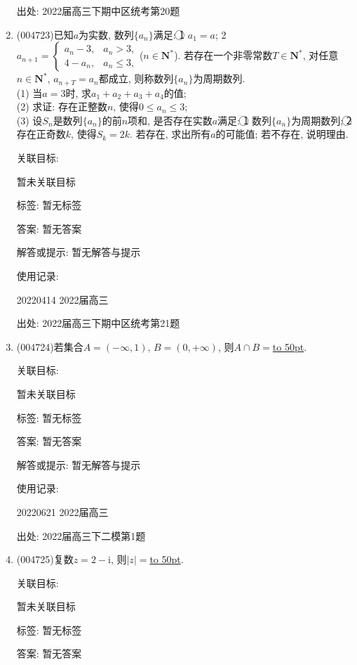 \documentclass[10pt,a4paper]{article}
\newcommand{\blank}[1]{\underline{\hbox to #1pt{}}}
\begin{document}
\begin{enumerate}[1.]
出处: 2022届高三下期中区统考第20题
\item { (004723)}已知$a$为实数, 数列$\{a_n\}$满足: \textcircled{1} $a_1=a$; \textcircled{2} $a_{n+1}=\begin{cases}
a_n-3, & a_n>3, \\ 4-a_n, & a_n\le 3,\end{cases}$($n\in \mathbf{N}^*$). 若存在一个非零常数$T\in \mathbf{N}^*$, 对任意$n\in \mathbf{N}^*$, $a_{n+T}=a_n$都成立, 则称数列$\{a_n\}$为周期数列.\\
(1) 当$a=3$时, 求$a_1+a_2+a_3+a_4$的值;\\
(2) 求证: 存在正整数$n$, 使得$0\le a_n\le 3$;\\
(3) 设$S_n$是数列$\{a_n\}$的前$n$项和, 是否存在实数$a$满足: \textcircled{1} 数列$\{a_n\}$为周期数列; \textcircled{2} 存在正奇数$k$, 使得$S_k=2k$. 若存在, 求出所有$a$的可能值; 若不存在, 说明理由.


关联目标:

暂未关联目标



标签: 暂无标签

答案: 暂无答案

解答或提示: 暂无解答与提示

使用记录:

20220414	2022届高三			


出处: 2022届高三下期中区统考第21题
\item { (004724)}若集合$A=(-\infty ,1)$, $B=(0,+\infty)$, 则$A\cap B=$\blank{50}.


关联目标:

暂未关联目标



标签: 暂无标签

答案: 暂无答案

解答或提示: 暂无解答与提示

使用记录:

20220621	2022届高三	


出处: 2022届高三下二模第1题
\item { (004725)}复数$z=2-\mathrm{i}$, 则$|z|=$\blank{50}.


关联目标:

暂未关联目标



标签: 暂无标签

答案: 暂无答案


\end{enumerate}
\end{document}
